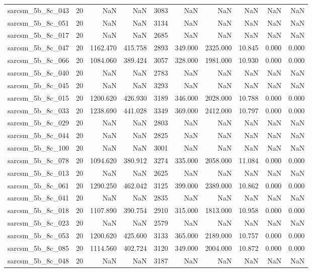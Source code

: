 \begin{tabular}{lrrrrrrrrr}
sarcsm\_5b\_8c\_043 & 20 & NaN & NaN & 3083 & NaN & NaN & NaN & NaN & NaN \\
sarcsm\_5b\_8c\_051 & 20 & NaN & NaN & 3134 & NaN & NaN & NaN & NaN & NaN \\
sarcsm\_5b\_8c\_017 & 20 & NaN & NaN & 2685 & NaN & NaN & NaN & NaN & NaN \\
sarcsm\_5b\_8c\_047 & 20 & 1162.470 & 415.758 & 2893 & 349.000 & 2325.000 & 10.845 & 0.000 & 0.000 \\
sarcsm\_5b\_8c\_066 & 20 & 1084.060 & 389.424 & 3057 & 328.000 & 1981.000 & 10.930 & 0.000 & 0.000 \\
sarcsm\_5b\_8c\_040 & 20 & NaN & NaN & 2783 & NaN & NaN & NaN & NaN & NaN \\
sarcsm\_5b\_8c\_045 & 20 & NaN & NaN & 3293 & NaN & NaN & NaN & NaN & NaN \\
sarcsm\_5b\_8c\_015 & 20 & 1200.620 & 426.930 & 3189 & 346.000 & 2028.000 & 10.788 & 0.000 & 0.000 \\
sarcsm\_5b\_8c\_033 & 20 & 1238.690 & 441.028 & 3349 & 369.000 & 2412.000 & 10.797 & 0.000 & 0.000 \\
sarcsm\_5b\_8c\_029 & 20 & NaN & NaN & 2803 & NaN & NaN & NaN & NaN & NaN \\
sarcsm\_5b\_8c\_044 & 20 & NaN & NaN & 2825 & NaN & NaN & NaN & NaN & NaN \\
sarcsm\_5b\_8c\_100 & 20 & NaN & NaN & 3001 & NaN & NaN & NaN & NaN & NaN \\
sarcsm\_5b\_8c\_078 & 20 & 1094.620 & 380.912 & 3274 & 335.000 & 2058.000 & 11.084 & 0.000 & 0.000 \\
sarcsm\_5b\_8c\_013 & 20 & NaN & NaN & 2625 & NaN & NaN & NaN & NaN & NaN \\
sarcsm\_5b\_8c\_061 & 20 & 1290.250 & 462.042 & 3125 & 399.000 & 2389.000 & 10.862 & 0.000 & 0.000 \\
sarcsm\_5b\_8c\_041 & 20 & NaN & NaN & 2835 & NaN & NaN & NaN & NaN & NaN \\
sarcsm\_5b\_8c\_018 & 20 & 1107.890 & 390.754 & 2910 & 315.000 & 1813.000 & 10.958 & 0.000 & 0.000 \\
sarcsm\_5b\_8c\_023 & 20 & NaN & NaN & 2579 & NaN & NaN & NaN & NaN & NaN \\
sarcsm\_5b\_8c\_053 & 20 & 1200.620 & 425.600 & 3133 & 365.000 & 2189.000 & 10.757 & 0.000 & 0.000 \\
sarcsm\_5b\_8c\_085 & 20 & 1114.560 & 402.724 & 3120 & 349.000 & 2004.000 & 10.872 & 0.000 & 0.000 \\
sarcsm\_5b\_8c\_048 & 20 & NaN & NaN & 3187 & NaN & NaN & NaN & NaN & NaN \\

\end{tabular}
